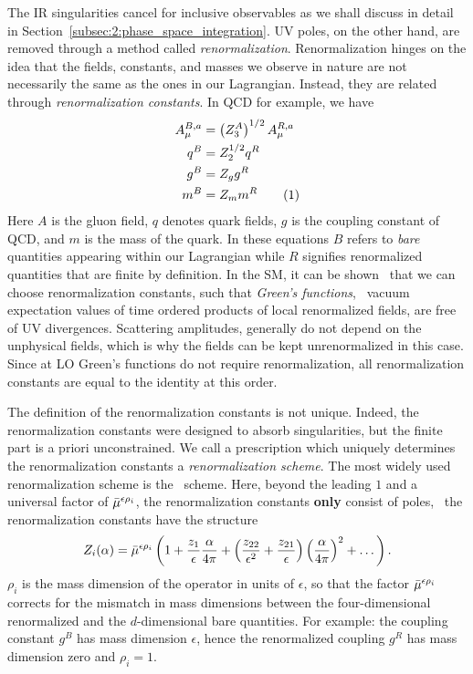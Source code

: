 The \acs{IR} singularities cancel for inclusive observables as we shall discuss in detail in Section~\ref{subsec:2:phase_space_integration}. \acs{UV} poles, on the other hand, are removed through a method called \textit{renormalization}. Renormalization hinges on the idea that the fields, constants, and masses we observe in nature are not necessarily the same as the ones in our Lagrangian. Instead, they are related through \textit{renormalization constants}. In \acs{QCD} for example, we have
\begin{align*}
A_\mu^{B,a} &= \left(Z_3^A \right)^{1/2} A_\mu^{R,a} \\
q^{B} &= Z_2^{1/2} q^R \\
g^B &= Z_g g^R \\
m^B &= Z_m m^R
\refstepcounter{equation}
\tag{\theequation} \label{eq:2:renormalization_QCD}
\end{align*}
Here $A$ is the gluon field, $q$ denotes quark fields, $g$ is the coupling constant of \acs{QCD}, and $m$ is the mass of the quark. In these equations $B$ refers to \textit{bare} quantities appearing within our Lagrangian while $R$ signifies renormalized quantities that are finite by definition. In the \acs{SM}, it can be shown~\cite{tHooft:1971qjg,tHooft:1972tcz} that we can choose renormalization constants, such that \textit{Green's functions}, \ie\ vacuum expectation values of time ordered products of local renormalized fields, are free of \acs{UV} divergences. Scattering amplitudes, generally do not depend on the unphysical fields, which is why the fields can be kept unrenormalized in this case. Since at \acs{LO} Green's functions do not require renormalization, all renormalization constants are equal to the identity at this order.

The definition of the renormalization constants is not unique. Indeed, the renormalization constants were designed to absorb singularities, but the finite part is a priori unconstrained. We call a prescription which uniquely determines the renormalization constants a \textit{renormalization scheme}. The most widely used renormalization scheme is the \MS\ scheme. Here, beyond the leading $1$ and a universal factor of $\bar{\mu}^{\epsilon \rho_i}$, the renormalization constants \textbf{only} consist of poles, \ie\ the renormalization constants have the structure
\begin{equation}
Z_i(\alpha) = \bar{\mu}^{\epsilon \rho_i} \left(1 + \frac{z_1}{\epsilon} \frac{\alpha}{4 \pi} + \left(\frac{z_{22}}{\epsilon^2} + \frac{z_{21}}{\epsilon} \right) \left( \frac{\alpha}{4 \pi} \right)^2 + \dots \right).
\end{equation}
$\rho_i$ is the mass dimension of the operator in units of $\epsilon$, so that the factor $\bar{\mu}^{\epsilon \rho_i}$ corrects for the mismatch in mass dimensions between the four-dimensional renormalized and the $d$-dimensional bare quantities. For example: the coupling constant $g^B$ has mass dimension $\epsilon$, hence the renormalized coupling $g^R$ has mass dimension zero and $\rho_i = 1$.

